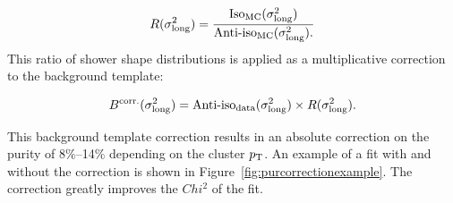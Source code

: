 
\begin{equation}
    R(\sigma^{2}_{\mathrm{long}})=\frac{\text{Iso}_{\text{MC}}(\sigma^{2}_{\mathrm{long}})}{\text{Anti-iso}_{\text{MC}}(\sigma^{2}_{\mathrm{long}}).}
    \label{eq:bkgtemplateweights}
\end{equation}
This ratio of shower shape distributions is applied as a multiplicative correction to the background template:

\begin{equation}
    B^{\text{corr.}}(\sigma^{2}_{\mathrm{long}})=\text{Anti-iso}_{\text{data}}(\sigma^{2}_{\mathrm{long}})\times R(\sigma^{2}_{\mathrm{long}}).
    \label{eq:bkgtemplatecorrection}
\end{equation}

This background template correction results in an absolute correction on the purity of 8$\%$--14$\%$ depending on the cluster $p_{\mathrm{T}}$. An example of a fit with and without the correction is shown in Figure~\ref{fig:purcorrectionexample}. The correction greatly improves the $Chi^2$ of the fit. 



